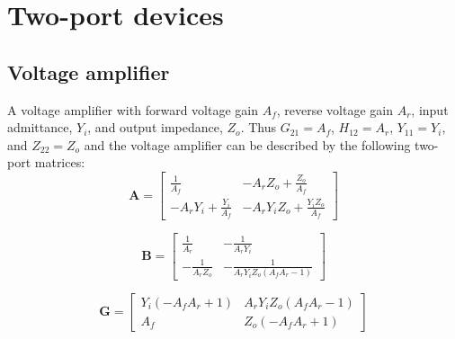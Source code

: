 \documentclass[a4paper, 12pt]{article}
\newcommand{\mat}[1]{\mathbf{#1}}
\begin{document}




\section{Two-port devices}


\subsection{Voltage amplifier}

A voltage amplifier with forward voltage gain $A_f$, reverse voltage
gain $A_r$, input admittance, $Y_i$, and output impedance, $Z_o$.
Thus $G_{21} = A_f$, $H_{12} = A_r$, $Y_{11} = Y_i$, and $Z_{22} =
Z_o$ and the voltage amplifier can be described by the following
two-port matrices:
%
\begin{equation}
\mat{A} = \left[\begin{matrix}\frac{1}{A_{f}} & - A_{r} Z_{o} + \frac{Z_{o}}{A_{f}}\\- A_{r} Y_{i} + \frac{Y_{i}}{A_{f}} & - A_{r} Y_{i} Z_{o} + \frac{Y_{i} Z_{o}}{A_{f}}\end{matrix}\right]
\end{equation}

\begin{equation}
\mat{B} = \left[\begin{matrix}\frac{1}{A_{r}} & - \frac{1}{A_{r} Y_{i}}\\- \frac{1}{A_{r} Z_{o}} & - \frac{1}{A_{r} Y_{i} Z_{o} \left(A_{f} A_{r} - 1\right)}\end{matrix}\right]
\end{equation}

\begin{equation}
\mat{G} = \left[\begin{matrix}Y_{i} \left(- A_{f} A_{r} + 1\right) & A_{r} Y_{i} Z_{o} \left(A_{f} A_{r} - 1\right)\\A_{f} & Z_{o} \left(- A_{f} A_{r} + 1\right)\end{matrix}\right]
\end{equation}
\end{document}
